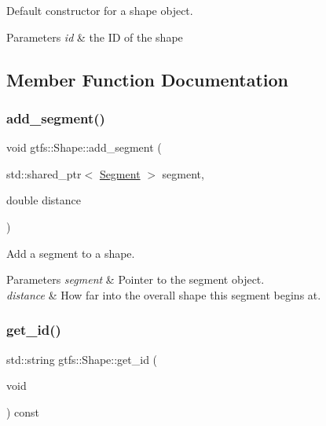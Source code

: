 Default constructor for a shape object. 
\begin{DoxyParams}{Parameters}
{\em id} & the ID of the shape \\
\hline
\end{DoxyParams}


\subsection{Member Function Documentation}
\mbox{\label{classgtfs_1_1Shape_afb5bfd99bafb82eb085198218fe13342}} 
\subsubsection{\texorpdfstring{add\+\_\+segment()}{add\_segment()}}
{\footnotesize\ttfamily void gtfs\+::\+Shape\+::add\+\_\+segment (\begin{DoxyParamCaption}\item[{std\+::shared\+\_\+ptr$<$ \hyperlink{classgtfs_1_1Segment}{Segment} $>$}]{segment,  }\item[{double}]{distance }\end{DoxyParamCaption})}

Add a segment to a shape. 
\begin{DoxyParams}{Parameters}
{\em segment} & Pointer to the segment object. \\
\hline
{\em distance} & How far into the overall shape this segment begins at. \\
\hline
\end{DoxyParams}
\mbox{\label{classgtfs_1_1Shape_ad8f8c0c5c19d4a8e840be1ed9a89de9e}} 
\subsubsection{\texorpdfstring{get\+\_\+id()}{get\_id()}}
{\footnotesize\ttfamily std\+::string gtfs\+::\+Shape\+::get\+\_\+id (\begin{DoxyParamCaption}\item[{void}]{ }\end{DoxyParamCaption}) const\hspace{0.3cm}{\ttfamily [inline]}}

